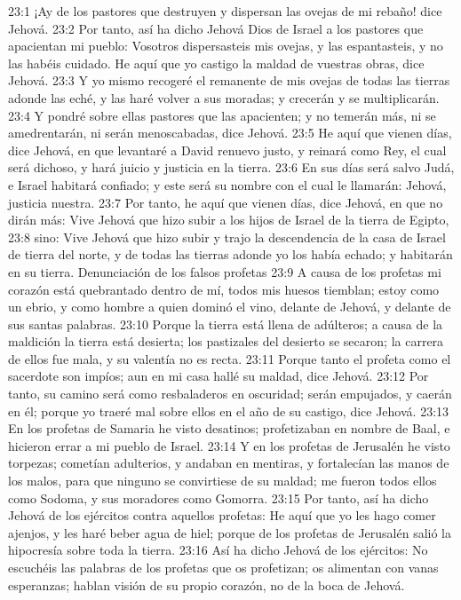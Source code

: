 23:1 ¡Ay de los pastores que destruyen y dispersan las ovejas de mi rebaño! dice Jehová. 
23:2 Por tanto, así ha dicho Jehová Dios de Israel a los pastores que apacientan mi pueblo: Vosotros dispersasteis mis ovejas, y las espantasteis, y no las habéis cuidado. He aquí que yo castigo la maldad de vuestras obras, dice Jehová. 
23:3 Y yo mismo recogeré el remanente de mis ovejas de todas las tierras adonde las eché, y las haré volver a sus moradas; y crecerán y se multiplicarán. 
23:4 Y pondré sobre ellas pastores que las apacienten; y no temerán más, ni se amedrentarán, ni serán menoscabadas, dice Jehová. 
23:5 He aquí que vienen días, dice Jehová, en que levantaré a David renuevo justo, y reinará como Rey, el cual será dichoso, y hará juicio y justicia en la tierra. 
23:6 En sus días será salvo Judá, e Israel habitará confiado; y este será su nombre con el cual le llamarán: Jehová, justicia nuestra. 
23:7 Por tanto, he aquí que vienen días, dice Jehová, en que no dirán más: Vive Jehová que hizo subir a los hijos de Israel de la tierra de Egipto, 
23:8 sino: Vive Jehová que hizo subir y trajo la descendencia de la casa de Israel de tierra del norte, y de todas las tierras adonde yo los había echado; y habitarán en su tierra. 
Denunciación de los falsos profetas 
23:9 A causa de los profetas mi corazón está quebrantado dentro de mí, todos mis huesos tiemblan; estoy como un ebrio, y como hombre a quien dominó el vino, delante de Jehová, y delante de sus santas palabras. 
23:10 Porque la tierra está llena de adúlteros; a causa de la maldición la tierra está desierta; los pastizales del desierto se secaron; la carrera de ellos fue mala, y su valentía no es recta. 
23:11 Porque tanto el profeta como el sacerdote son impíos; aun en mi casa hallé su maldad, dice Jehová. 
23:12 Por tanto, su camino será como resbaladeros en oscuridad; serán empujados, y caerán en él; porque yo traeré mal sobre ellos en el año de su castigo, dice Jehová. 
23:13 En los profetas de Samaria he visto desatinos; profetizaban en nombre de Baal, e hicieron errar a mi pueblo de Israel. 
23:14 Y en los profetas de Jerusalén he visto torpezas; cometían adulterios, y andaban en mentiras, y fortalecían las manos de los malos, para que ninguno se convirtiese de su maldad; me fueron todos ellos como Sodoma, y sus moradores como Gomorra. 
23:15 Por tanto, así ha dicho Jehová de los ejércitos contra aquellos profetas: He aquí que yo les hago comer ajenjos, y les haré beber agua de hiel; porque de los profetas de Jerusalén salió la hipocresía sobre toda la tierra. 
23:16 Así ha dicho Jehová de los ejércitos: No escuchéis las palabras de los profetas que os profetizan; os alimentan con vanas esperanzas; hablan visión de su propio corazón, no de la boca de Jehová. 
